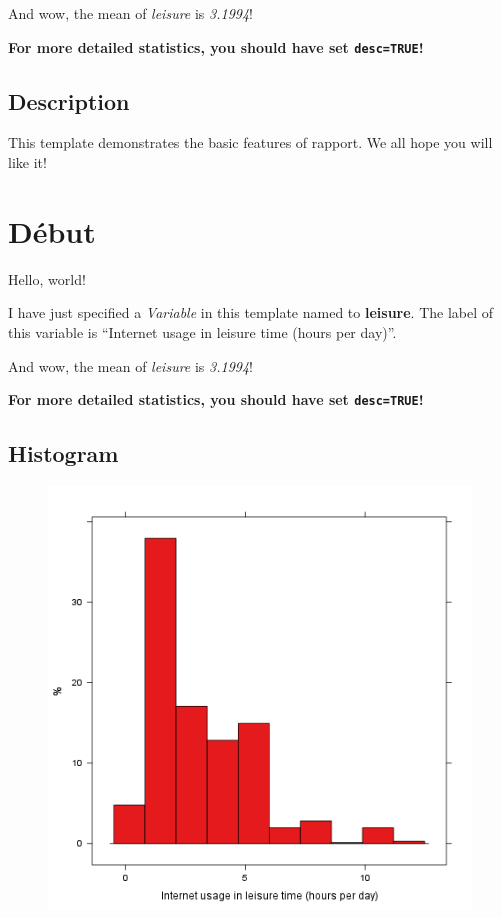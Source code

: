 \documentclass{article}
\makeatletter
\def\maxwidth{\ifdim\Gin@nat@width>\linewidth\linewidth
\else\Gin@nat@width\fi}
\let\Oldincludegraphics\includegraphics
\renewcommand{\includegraphics}[1]{\Oldincludegraphics[width=\maxwidth]{#1}}
\makeatother
\begin{document}
And wow, the mean of \emph{leisure} is \emph{3.1994}!

\textbf{For more detailed statistics, you should have set
\texttt{desc=TRUE}!}

\subsection{Description}

This template demonstrates the basic features of rapport. We all hope
you will like it!

\section{Début}

Hello, world!

I have just specified a \emph{Variable} in this template named to
\textbf{leisure}. The label of this variable is ``Internet usage in
leisure time (hours per day)''.

And wow, the mean of \emph{leisure} is \emph{3.1994}!

\textbf{For more detailed statistics, you should have set
\texttt{desc=TRUE}!}

\subsection{Histogram}

\begin{figure}[htbp]
\centering
\includegraphics{9542b7929dcd934208ee4f18bde6ff31.png}
\caption{}
\end{figure}
\end{document}
